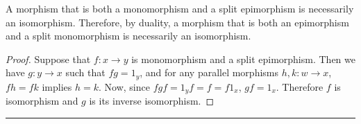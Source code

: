 \begin{thm} A morphism that is both a monomorphism and a split epimorphism is necessarily an isomorphism. Therefore, by duality, a morphism that is both an epimorphism and a split monomorphism is necessarily an isomorphism.
\end{thm}
\begin{proof} Suppose that $f:x\rightarrow y$ is monomorphism and a split epimorphism. Then we have $g:y\rightarrow x$ such that $fg=1_y$, and for any parallel morphisms $h,k:w\rightarrow x$, $fh=fk$ implies $h=k$. Now, since $fgf=1_y f = f = f 1_x$, $gf=1_x$. Therefore $f$ is isomorphism and $g$ is its inverse isomorphism.
\end{proof}

\noindent\rule{\textwidth}{1pt}
\newline
